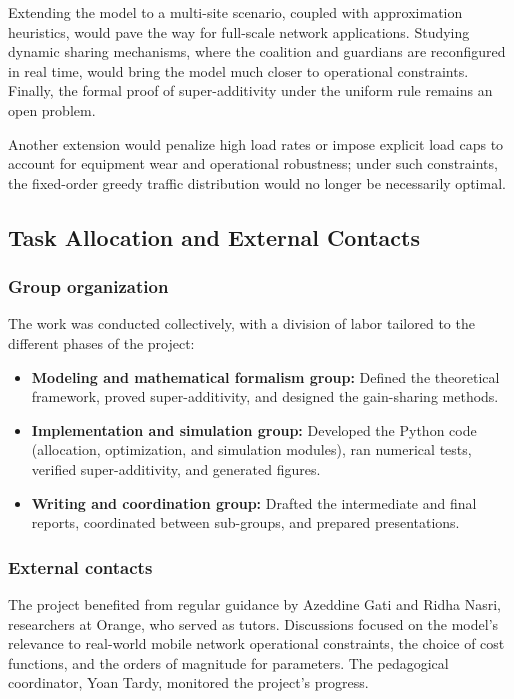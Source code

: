 Extending the model to a multi-site scenario, coupled with approximation heuristics, would pave the way for full-scale network applications. Studying dynamic sharing mechanisms, where the coalition and guardians are reconfigured in real time, would bring the model much closer to operational constraints. Finally, the formal proof of super-additivity under the uniform rule remains an open problem.

Another extension would penalize high load rates or impose explicit load
caps to account for equipment wear and operational robustness; under such
constraints, the fixed-order greedy traffic distribution would no longer
be necessarily optimal.


\subsection{Task Allocation and External Contacts}

\subsubsection{Group organization}
The work was conducted collectively, with a division of labor tailored to the different phases of the project:
\begin{itemize}
    \item \textbf{Modeling and mathematical formalism group:} Defined the theoretical framework, proved super-additivity, and designed the gain-sharing methods.
    \item \textbf{Implementation and simulation group:} Developed the Python code (allocation, optimization, and simulation modules), ran numerical tests, verified super-additivity, and generated figures.
    \item \textbf{Writing and coordination group:} Drafted the intermediate and final reports, coordinated between sub-groups, and prepared presentations.
\end{itemize}

\subsubsection{External contacts}
The project benefited from regular guidance by Azeddine Gati and Ridha Nasri, researchers at Orange, who served as tutors. Discussions focused on the model's relevance to real-world mobile network operational constraints, the choice of cost functions, and the orders of magnitude for parameters. The pedagogical coordinator, Yoan Tardy, monitored the project's progress.


